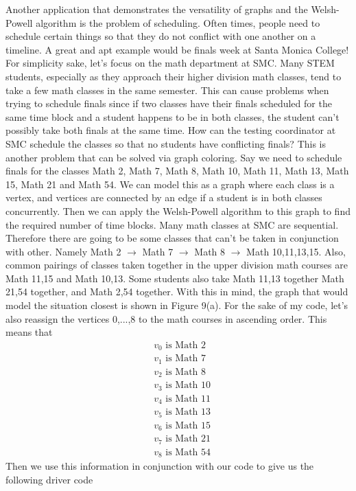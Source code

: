 \documentclass[12pt, letterpaper]{article}
\begin{document}
Another application that demonstrates the versatility of graphs and the Welsh-Powell algorithm is the problem of scheduling. Often times, people need to schedule certain things so that they do not conflict with one another on a timeline. A great and apt example would be finals week at Santa Monica College! For simplicity sake, let's focus on the math department at SMC. Many STEM students, especially as they approach their higher division math classes, tend to take a few math classes in the same semester. This can cause problems when trying to schedule finals since if two classes have their finals scheduled for the same time block and a student happens to be in both classes, the student can't possibly take both finals at the same time. How can the testing coordinator at SMC schedule the classes so that no students have conflicting finals? This is another problem that can be solved via graph coloring. Say we need to schedule finals for the classes Math 2, Math 7, Math 8, Math 10, Math 11, Math 13, Math 15, Math 21 and Math 54. We can model this as a graph where each class is a vertex, and vertices are connected by an edge if a student is in both classes concurrently. Then we can apply the Welsh-Powell algorithm to this graph to find the required number of time blocks. Many math classes at SMC are sequential. Therefore there are going to be some classes that can't be taken in conjunction with other. Namely Math 2 $\rightarrow$ Math 7 $\rightarrow$ Math 8 $\rightarrow$ Math 10,11,13,15. Also, common pairings of classes taken together in the upper division math courses are Math 11,15 and Math 10,13. Some students also take Math 11,13 together Math 21,54 together, and Math 2,54 together. With this in mind, the graph that would model the situation closest  is shown in Figure 9(a). For the sake of my code, let's also reassign the vertices 0,...,8 to the math courses in ascending order. This means that
\begin{align*}
&v_0 \text{ is Math 2}\\
&v_1 \text{ is Math 7}\\
&v_2 \text{ is Math 8}\\
&v_3 \text{ is Math 10}\\
&v_4 \text{ is Math 11}\\
&v_5 \text{ is Math 13}\\
&v_6 \text{ is Math 15}\\
&v_7 \text{ is Math 21}\\
&v_8 \text{ is Math 54}
\end{align*}
Then we use this information in conjunction with our code to give us the following driver code
\end{document}
